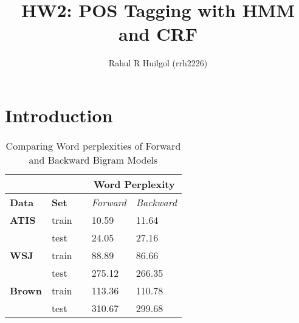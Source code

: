 \documentclass{article}
\begin{document}
\title{\vspace{-4ex}HW2: POS Tagging with HMM and CRF}
\author{Rahul R Huilgol (rrh2226)}
\maketitle

\section{Introduction}


\begin{table}[h]
\centering
\begin{tabular}{@{}lllll@{}}
\toprule
\textbf{}      & \textbf{}    &  & \multicolumn{2}{c}{\textbf{Word Perplexity}} \\ \midrule
\textbf{Data}  & \textbf{Set} &  & \textit{Forward}     & \textit{Backward}     \\ \midrule
\textbf{ATIS}  & train        &  & 10.59               & 11.64               \\ \midrule
               & test         &  & 24.05               & 27.16                \\ \midrule
\textbf{WSJ}   & train        &  & 88.89               & 86.66                \\ \midrule
               & test         &  & 275.12               & 266.35               \\ \midrule
\textbf{Brown} & train        &  & 113.36              & 110.78                \\ \midrule
               & test         &  & 310.67              & 299.68               \\ \bottomrule
\end{tabular}
\caption{Comparing Word perplexities of Forward and Backward Bigram Models}
\label{backvforw}
\end{table}
\end{document}
